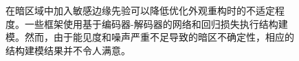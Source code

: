 \documentclass[CJK,aspectratio=169]{beamer}  %
\begin{document}
\begin{frame}
\begin{figure}
\begin{minipage}{.35\columnwidth}
\begin{itemize}
				{ \yahei 在暗区域中加入敏感边缘先验可以降低优化外观重构时的不适定程度\textcolor{blue}{\citep{xu2023low}}。一些框架\textcolor{blue}{\citep{rana2021edge}}\textcolor{blue}{\citep{zhu2020eemefn}}使用基于编码器-解码器的网络和回归损失执行结构建模。然而，由于能见度和噪声严重不足导致的暗区不确定性，相应的结构建模结果并不令人满意。}
			\end{itemize}
		\end{minipage}
		\begin{minipage}{.6\columnwidth}
			\setlength{\abovecaptionskip}{-0.05cm}
			\centering 
			\begin{minipage}{0.18\columnwidth}

\end{minipage}
\end{minipage}
\end{figure}
\end{frame}
\end{document}
